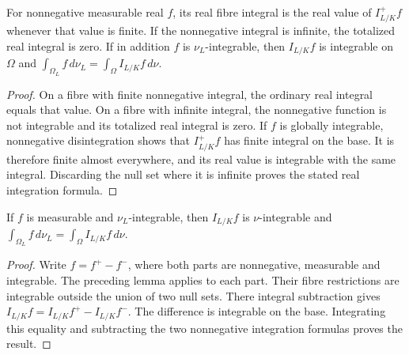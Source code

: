 \begin{lemma}\label{lem:algebraic-nonnegative-real-average}
\leanok
{}
For nonnegative measurable real $f$, its real fibre integral is the
real value of $I^+_{L/K}f$ whenever that value is finite. If the
nonnegative integral is infinite, the totalized real integral is zero.
If in addition $f$ is $\nu_L$-integrable, then $I_{L/K}f$ is integrable
on $\Omega$ and
$\int_{\Omega_L}f\,d\nu_L=\int_\Omega I_{L/K}f\,d\nu$.
\end{lemma}
\begin{proof}
On a fibre with finite nonnegative integral, the ordinary real integral
equals that value. On a fibre with infinite integral, the nonnegative
function is not integrable and its totalized real integral is zero.
If $f$ is globally integrable, nonnegative disintegration shows that
$I^+_{L/K}f$ has finite integral on the base. It is therefore finite
almost everywhere, and its real value is integrable with the same
integral. Discarding the null set where it is infinite proves the
stated real integration formula.
\end{proof}

\begin{lemma}\label{lem:algebraic-measurable-signed-disintegration}
\leanok
{}
If $f$ is measurable and $\nu_L$-integrable, then $I_{L/K}f$ is
$\nu$-integrable and
$\int_{\Omega_L}f\,d\nu_L=\int_\Omega I_{L/K}f\,d\nu$.
\end{lemma}
\begin{proof}
Write $f=f^+-f^-$, where both parts are nonnegative, measurable and
integrable. The preceding lemma applies to each part. Their fibre
restrictions are integrable outside the union of two null sets.
There integral subtraction gives $I_{L/K}f=I_{L/K}f^+-I_{L/K}f^-$.
The difference is integrable on the base. Integrating this equality
and subtracting the two nonnegative integration formulas proves the result.
\end{proof}

